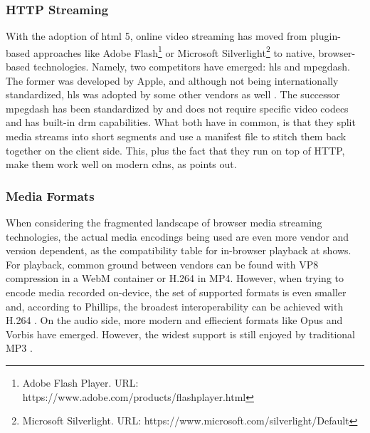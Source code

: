 \subsubsection{HTTP Streaming}
\label{subsec:http-streaming}

With the adoption of \gls{html} 5, online video streaming has moved from plugin-based approaches like Adobe Flash\footnote{\label{adobe-flash}Adobe Flash Player. URL: {https://www.adobe.com/products/flashplayer.html}} or Microsoft Silverlight\footnote{\label{silverlight}Microsoft Silverlight. URL: {https://www.microsoft.com/silverlight/Default}} to native, browser-based technologies. Namely, two competitors have emerged: \gls{hls} and \gls{mpegdash}. The former was developed by Apple, and although not being internationally standardized, \gls{hls} was adopted by some other vendors as well \cite{caniuse-hls}. The successor \gls{mpegdash} has been standardized by \citet{iso-mpeg-dash} and does not require specific video codecs and has built-in \gls{drm} capabilities. What both have in common, is that they split media streams into short segments and use a manifest file to stitch them back together on the client side. This, plus the fact that they run on top of HTTP, make them work well on modern \glspl{cdn}, as \cite{hls-vs-dash} points out.

\subsubsection{Media Formats}

When considering the fragmented landscape of browser media streaming technologies, the actual media encodings being used are even more vendor and version dependent, as the compatibility table for in-browser playback at \cite{media-format-browser-compat} shows. For playback, common ground between vendors can be found with VP8 compression in a WebM container or H.264 in MP4. However, when trying to encode media recorded on-device, the set of supported formats is even smaller and, according to Phillips, the broadest interoperability can be achieved with H.264 \cite[\S5.1]{webrtc-hacks-safari}. On the audio side, more modern and effiecient formats like Opus and Vorbis have emerged. However, the widest support is still enjoyed by traditional MP3 \cite{media-format-browser-compat}.
